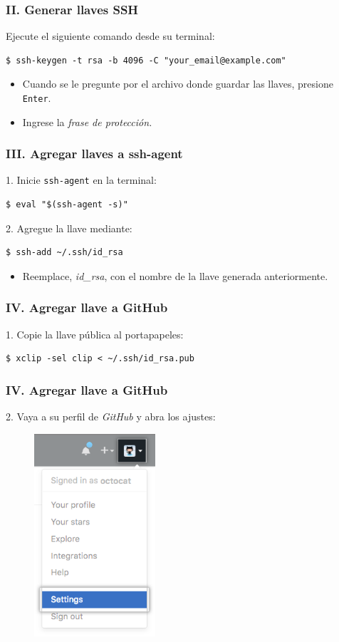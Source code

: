 \documentclass{beamer}
\begin{document}
\begin{frame}[fragile]
  \frametitle{II. Generar llaves SSH}
  Ejecute el siguiente comando desde su terminal:
\begin{verbatim}
$ ssh-keygen -t rsa -b 4096 -C "your_email@example.com"
\end{verbatim}
  \begin{itemize}
  \item Cuando se le pregunte por el archivo donde guardar las llaves,
    presione \texttt{Enter}.
  \item Ingrese la \emph{frase de protecci\'on.}
  \end{itemize}
\end{frame}

\begin{frame}
  \frametitle{III. Agregar llaves a ssh-agent}
  1. Inicie \texttt{ssh-agent} en la terminal:
\begin{verbatim}
$ eval "$(ssh-agent -s)"
\end{verbatim}
  2. Agregue la llave mediante:
\begin{verbatim}
$ ssh-add ~/.ssh/id_rsa
\end{verbatim}
  \begin{itemize}
  \item Reemplace, \emph{id\_rsa}, con el nombre de la llave generada
    anteriormente.
  \end{itemize}
\end{frame}

\begin{frame}[fragile]
  \frametitle{IV. Agregar llave a GitHub}
  1. Copie la llave p\'ublica al portapapeles:
\begin{verbatim}
$ xclip -sel clip < ~/.ssh/id_rsa.pub
\end{verbatim}
\end{frame}

\begin{frame}[fragile]
  \frametitle{IV. Agregar llave a GitHub}
  2. Vaya a su perfil de \textit{GitHub} y abra los ajustes:
  \begin{figure}[hp]
    \centering \includegraphics[width=0.4\textwidth]{fig/userbar-account-settings}
    \label{fig:gssh01}
  \end{figure}
\end{frame}
\end{document}
